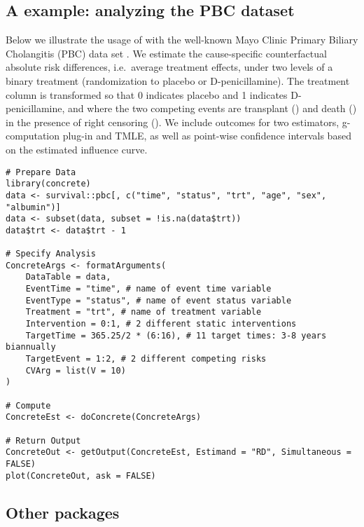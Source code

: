 \hypertarget{sec-nutshell}{%
\subsection{\texorpdfstring{A  example: analyzing the PBC dataset}{A  example: analyzing the PBC dataset}}\label{sec-nutshell}}

Below we illustrate the usage of  with the well-known Mayo Clinic Primary Biliary Cholangitis (PBC) data set \citep{fleming_counting_1991, therneau_modeling_2000}. We estimate the cause-specific counterfactual absolute risk differences, i.e.~average treatment effects, under two levels of a binary treatment (randomization to placebo or D-penicillamine). The treatment column  is transformed so that 0 indicates placebo and 1 indicates D-penicillamine, and where the two competing events are transplant () and death () in the presence of right censoring (). We include outcomes for two estimators, g-computation plug-in and TMLE, as well as point-wise confidence intervals based on the estimated influence curve.

\begin{verbatim}
# Prepare Data
library(concrete)
data <- survival::pbc[, c("time", "status", "trt", "age", "sex", "albumin")]
data <- subset(data, subset = !is.na(data$trt))
data$trt <- data$trt - 1
        
# Specify Analysis
ConcreteArgs <- formatArguments(
    DataTable = data,
    EventTime = "time", # name of event time variable
    EventType = "status", # name of event status variable
    Treatment = "trt", # name of treatment variable
    Intervention = 0:1, # 2 different static interventions
    TargetTime = 365.25/2 * (6:16), # 11 target times: 3-8 years biannually
    TargetEvent = 1:2, # 2 different competing risks
    CVArg = list(V = 10)
)

# Compute
ConcreteEst <- doConcrete(ConcreteArgs)

# Return Output
ConcreteOut <- getOutput(ConcreteEst, Estimand = "RD", Simultaneous = FALSE)
plot(ConcreteOut, ask = FALSE)
\end{verbatim}

\hypertarget{sec-other-packages}{%
\subsection{Other packages}\label{sec-other-packages}}


